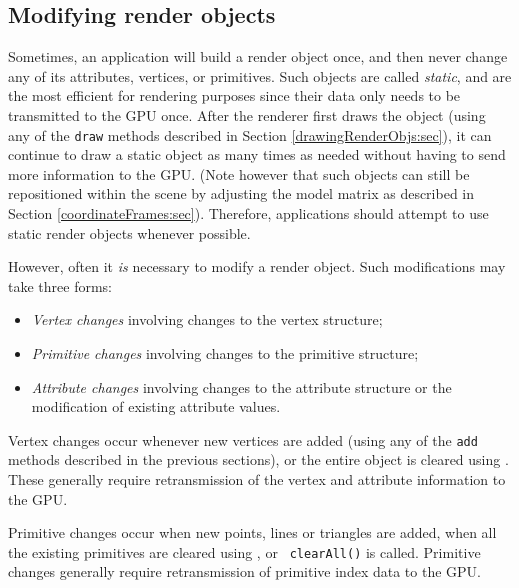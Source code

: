 \subsection{Modifying render objects}
\label{modifyingObjects:sec}

Sometimes, an application will build a render object once, and then
never change any of its attributes, vertices, or primitives. Such
objects are called {\it static}, and are the most efficient for
rendering purposes since their data only needs to be transmitted to
the GPU once.  After the renderer first draws the object (using any of
the {\tt draw} methods described in Section
\ref{drawingRenderObjs:sec}), it can continue to draw a static object
as many times as needed without having to send more information to the
GPU. (Note however that such objects can still be repositioned within the
scene by adjusting the model matrix as described in Section
\ref{coordinateFrames:sec}).  Therefore, applications should attempt
to use static render objects whenever possible.

However, often it {\it is} necessary to modify a render object.  Such
modifications may take three forms:

\begin{itemize}

\item {\it Vertex changes} involving changes to the vertex structure;

\item {\it Primitive changes} involving changes to the primitive structure;

\item {\it Attribute changes} involving changes to the attribute
structure or the modification of existing attribute values.

\end{itemize}

Vertex changes occur whenever new vertices are added (using any of the
{\tt add} methods described in the previous sections), or the entire
object is cleared using
.  These generally
require retransmission of the vertex and attribute information to the
GPU.

Primitive changes occur when new points, lines or triangles are added,
when all the existing primitives are cleared using
, or {\tt
clearAll()} is called.  Primitive changes generally require
retransmission of primitive index data to the GPU.

